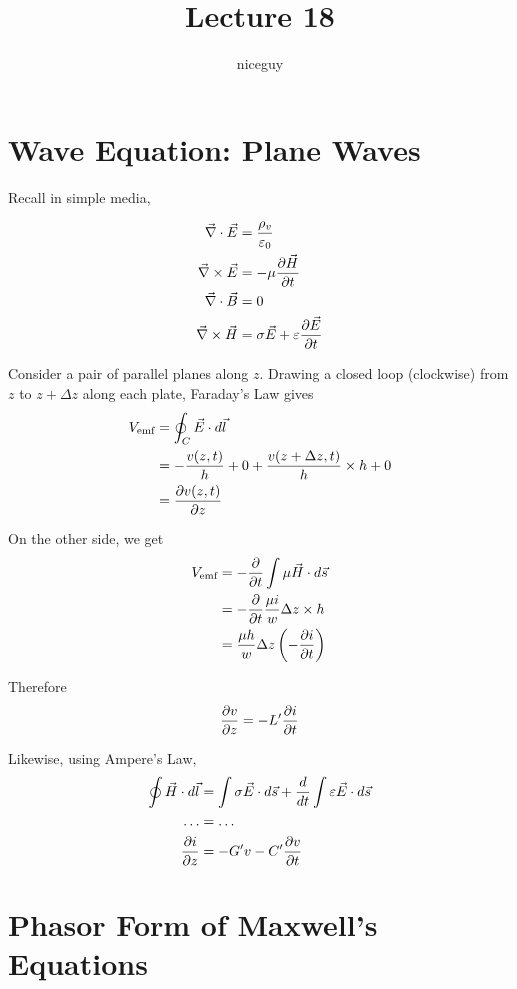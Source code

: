 \documentclass[12pt]{article}
\title{Lecture 18}
\author{niceguy}
\begin{document}
\maketitle

\section{Wave Equation: Plane Waves}

Recall in simple media,

\begin{align*}
    \vec\nabla \cdot \vec E &= \frac{\rho_v}{\varepsilon_0} \\
    \vec\nabla \times \vec E &= -\mu\frac{\partial \vec H}{\partial t} \\
    \vec\nabla \cdot \vec B &= 0 \\
    \vec\nabla \times \vec H &= \sigma\vec E + \varepsilon\frac{\partial \vec E}{\partial t}
\end{align*}

Consider a pair of parallel planes along $z$. Drawing a closed loop (clockwise) from $z$ to $z + \Delta z$ along each plate, Faraday's Law gives
\begin{align*}
    V_{\text{emf}} &= \oint_C \vec E \cdot d\vec l \\
                   &= -\frac{v(z,t)}{h} + 0 + \frac{v(z+\Delta z,t)}{h} \times h + 0 \\
                   &= \frac{\partial v(z,t)}{\partial z}
\end{align*}

On the other side, we get
\begin{align*}
    V_{\text{emf}} &= -\frac{\partial }{\partial t} \int \mu\vec H \cdot d\vec s \\
                   &= -\frac{\partial }{\partial t} \frac{\mu i}{w} \Delta z \times h \\
                   &= \frac{\mu h}{w}\Delta z \left(-\frac{\partial i}{\partial t}\right)
\end{align*}

Therefore
$$\frac{\partial v}{\partial z} = -L'\frac{\partial i}{\partial t}$$
 
Likewise, using Ampere's Law,
\begin{align*}
    \oint \vec H \cdot d\vec l &= \int\sigma\vec E \cdot d\vec s + \frac{d}{dt} \int\varepsilon\vec E \cdot d\vec s \\
    \dots &= \dots \\
    \frac{\partial i}{\partial z} &= -G'v - C'\frac{\partial v}{\partial t}
\end{align*}

\section{Phasor Form of Maxwell's Equations}
\end{document}
